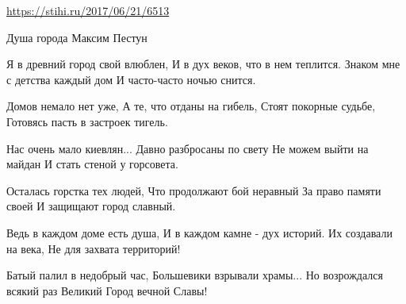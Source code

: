  
 
 
 
 

\url{https://stihi.ru/2017/06/21/6513}

Душа города
Максим Пестун

Я в древний город свой влюблен,
И в дух веков, что в нем теплится.
Знаком мне с детства каждый дом
И часто-часто ночью снится.

Домов немало нет уже,
А те, что отданы на гибель,
Стоят покорные судьбе,
Готовясь пасть в застроек тигель.

Нас очень мало киевлян...
Давно разбросаны по свету
Не можем выйти на майдан
И стать стеной у горсовета.

Осталась горстка тех людей,
Что продолжают бой неравный
За право памяти своей
И защищают город славный.
 
Ведь в каждом доме есть душа,
И в каждом камне  - дух историй.
Их создавали на века,
Не для захвата территорий!

Батый палил в недобрый час,
Большевики взрывали храмы...
Но возрождался всякий раз
Великий Город вечной Славы!
